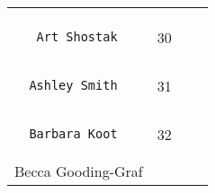 \documentclass[]{article}
\begin{document}
\begin{longtable}[c]{@{}llll@{}}
\begin{minipage}[t]{0.15\columnwidth}
\end{minipage}
\\\noalign{\medskip}
\begin{minipage}[t]{0.39\columnwidth}\raggedright
\begin{verbatim}
   Art Shostak
\end{verbatim}
\end{minipage} & \begin{minipage}[t]{0.10\columnwidth}\raggedright
30
\end{minipage} & \begin{minipage}[t]{0.13\columnwidth}\raggedright
\end{minipage} & \begin{minipage}[t]{0.15\columnwidth}\raggedright
\end{minipage}
\\\noalign{\medskip}
\begin{minipage}[t]{0.39\columnwidth}\raggedright
\begin{verbatim}
  Ashley Smith
\end{verbatim}
\end{minipage} & \begin{minipage}[t]{0.10\columnwidth}\raggedright
31
\end{minipage} & \begin{minipage}[t]{0.13\columnwidth}\raggedright
\end{minipage} & \begin{minipage}[t]{0.15\columnwidth}\raggedright
\end{minipage}
\\\noalign{\medskip}
\begin{minipage}[t]{0.39\columnwidth}\raggedright
\begin{verbatim}
  Barbara Koot
\end{verbatim}
\end{minipage} & \begin{minipage}[t]{0.10\columnwidth}\raggedright
32
\end{minipage} & \begin{minipage}[t]{0.13\columnwidth}\raggedright
\end{minipage} & \begin{minipage}[t]{0.15\columnwidth}\raggedright
\end{minipage}
\\\noalign{\medskip}
\begin{minipage}[t]{0.39\columnwidth}\raggedright
Becca Gooding-Graf
\end{minipage} & \begin{minipage}[t]{0.10\columnwidth}\raggedright

\end{minipage}
\end{longtable}
\end{document}
